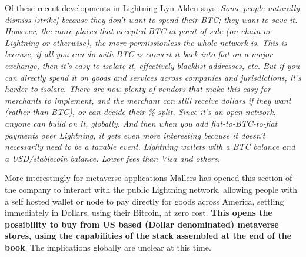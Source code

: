 Of these recent developments in Lightning \href{https://twitter.com/LynAldenContact/status/1512188883101966351}{Lyn Alden says}: \textit{Some people naturally dismiss [strike] because they don't want to spend their BTC; they want to save it. However, the more places that accepted BTC at point of sale (on-chain or Lightning or otherwise), the more permissionless the whole network is. This is because, if all you can do with BTC is convert it back into fiat on a major exchange, then it's easy to isolate it, effectively blacklist addresses, etc. But if you can directly spend it on goods and services across companies and jurisdictions, it's harder to isolate. There are now plenty of vendors that make this easy for merchants to implement, and the merchant can still receive dollars if they want (rather than BTC), or can decide their \% split. Since it's an open network, anyone can build on it, globally. And then when you add fiat-to-BTC-to-fiat payments over Lightning, it gets even more interesting because it doesn't necessarily need to be a taxable event. Lightning wallets with a BTC balance and a USD/stablecoin balance. Lower fees than Visa and others.}\par
More interestingly for metaverse applications Mallers has opened this section of the company to interact with the public Lightning network, allowing people with a self hosted wallet or node to pay directly for goods across America, settling immediately in Dollars, using their Bitcoin, at zero cost. \textbf{This opens the possibility to buy from US based (Dollar denominated) metaverse stores, using the capabilities of the stack assembled at the end of the book}. The implications globally are unclear at this time.\par
